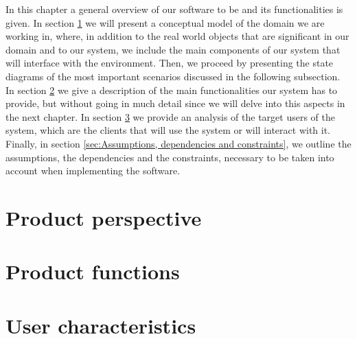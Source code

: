 In this chapter a general overview of our software to be and its functionalities is given. In section \ref{sec:product_perspective} we will present a conceptual model of the domain we are working in, where, in addition to the real world objects that are significant in our domain and to our system, we include the main components of our system that will interface with the environment. Then, we proceed by presenting the state diagrams of the most important scenarios discussed in the following subsection. In section \ref{sec:Product functions} we give a description of the main functionalities our system has to provide, but without going in much detail since we will delve into this aspects in the next chapter. In section \ref{sec:User_characteristics} we provide an analysis of the target users of the system, which are the clients that will use the system or will interact with it. Finally, in section \ref{sec:Assumptions, dependencies and constraints}, we outline the assumptions, the dependencies and the constraints, necessary to be taken into account when implementing the software.
\section{Product perspective}
\label{sec:product_perspective}%


\section{Product functions}
\label{sec:Product functions}%


\section{User characteristics}
\label{sec:User_characteristics}%


